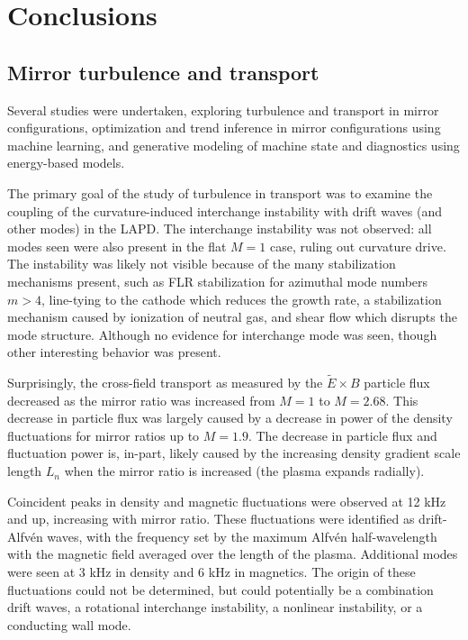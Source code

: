 \chapter{Conclusions}
\label{ch:conclusion}

\section{Mirror turbulence and transport}

Several studies were undertaken, exploring turbulence and transport in mirror configurations, optimization and trend inference in mirror configurations using machine learning, and generative modeling of machine state and diagnostics using energy-based models. 

The primary goal of the study of turbulence in transport was to examine the coupling of the curvature-induced interchange instability with drift waves (and other modes) in the LAPD. The interchange instability was not observed: all modes seen were also present in the flat $M=1$ case, ruling out curvature drive. The instability was likely not visible because of the many stabilization mechanisms present, such as FLR stabilization for azimuthal mode numbers $m>4$, line-tying to the cathode which reduces the growth rate, a stabilization mechanism caused by ionization of neutral gas, and shear flow which disrupts the mode structure. Although no evidence for interchange mode was seen, though other interesting behavior was present. 

Surprisingly, the cross-field transport as measured by the $\tilde{E} \times B$ particle flux decreased as the mirror ratio was increased from $M=1$ to $M=2.68$. This decrease in particle flux was largely caused by a decrease in power of the density fluctuations for mirror ratios up to $M=1.9$. The decrease in particle flux and fluctuation power is, in-part, likely caused by the increasing density gradient scale length $L_n$ when the mirror ratio is increased (the plasma expands radially). 

Coincident peaks in density and magnetic fluctuations were observed at 12 kHz and up, increasing with mirror ratio. These fluctuations were identified as drift-Alfv\'en waves, with the frequency set by the maximum Alfv\'en half-wavelength with the magnetic field averaged over the length of the plasma. Additional modes were seen at 3 kHz in density and 6 kHz in magnetics. The origin of these fluctuations could not be determined, but could potentially be a combination drift waves, a rotational interchange instability, a nonlinear instability, or a conducting wall mode. 


